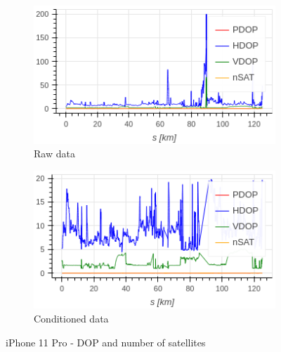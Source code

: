 \documentclass{article}
\begin{document}
			\begin{figure}[h]
		   		\centering
		     	\begin{subfigure}[b]{0.45\textwidth}
		      		\centering
		      	   \includegraphics[width=\textwidth]{raw_dop_0.png}
		      	   \caption{Raw data}
		      	   \label{fig:iPhone_raw_dop}
		     	\end{subfigure}
		     	\begin{subfigure}[b]{0.45\textwidth}
		      	   \centering
		      	   \includegraphics[width=\textwidth]{cond_dop_0.png}
		      	   \caption{Conditioned data}
		      	   \label{fig:iPhone_cond_dop}
		     	\end{subfigure}
		      \caption{iPhone 11 Pro - DOP and number of satellites}
		      \label{fig:iPhone_dop}
			\end{figure}
\end{document}
